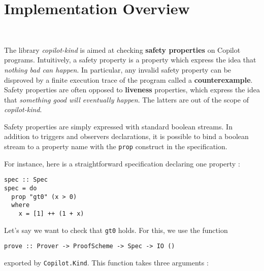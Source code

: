 \section{Implementation Overview}~\label{sec:overview}






The library \emph{copilot-kind} is aimed at checking \textbf{safety properties} on
Copilot programs. Intuitively, a safety property is a property which
express the idea that \emph{nothing bad can happen}. In particular, any
invalid safety property can be disproved by a finite execution trace of
the program called a \textbf{counterexample}. Safety properties are
often opposed to \textbf{liveness} properties, which express the idea
that \emph{something good will eventually happen}. The latters are out
of the scope of \emph{copilot-kind}.

Safety properties are simply expressed with standard boolean streams. In
addition to triggers and observers declarations, it is possible to bind
a boolean stream to a property name with the \texttt{prop} construct in
the specification.

For instance, here is a straightforward specification declaring one
property :
\begin{lstlisting}[frame=single]
spec :: Spec
spec = do
  prop "gt0" (x > 0)
  where
    x = [1] ++ (1 + x)
\end{lstlisting}

Let's say we want to check that \texttt{gt0} holds. For this, we use
the function


\begin{lstlisting}[frame=single]
    prove :: Prover -> ProofScheme -> Spec -> IO ()
\end{lstlisting}


exported by \texttt{Copilot.Kind}. This function takes three
arguments :

